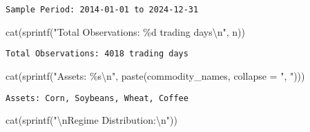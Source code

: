 \documentclass[
  10pt,
  a4paper,
]{article}
\newenvironment{Shaded}{\begin{snugshade}}{\end{snugshade}}
\newcommand{\AttributeTok}[1]{\textcolor[rgb]{0.40,0.45,0.13}{#1}}
\newcommand{\CommentTok}[1]{\textcolor[rgb]{0.37,0.37,0.37}{#1}}
\newcommand{\FunctionTok}[1]{\textcolor[rgb]{0.28,0.35,0.67}{#1}}
\newcommand{\NormalTok}[1]{\textcolor[rgb]{0.00,0.23,0.31}{#1}}
\newcommand{\OtherTok}[1]{\textcolor[rgb]{0.00,0.23,0.31}{#1}}
\newcommand{\SpecialCharTok}[1]{\textcolor[rgb]{0.37,0.37,0.37}{#1}}
\newcommand{\StringTok}[1]{\textcolor[rgb]{0.13,0.47,0.30}{#1}}
\begin{document}
\begin{Shaded}
\end{Shaded}

\begin{verbatim}
Sample Period: 2014-01-01 to 2024-12-31
\end{verbatim}

\begin{Shaded}
\begin{Highlighting}[]
\FunctionTok{cat}\NormalTok{(}\FunctionTok{sprintf}\NormalTok{(}\StringTok{"Total Observations: \%d trading days}\SpecialCharTok{\textbackslash{}n}\StringTok{"}\NormalTok{, n))}
\end{Highlighting}
\end{Shaded}

\begin{verbatim}
Total Observations: 4018 trading days
\end{verbatim}

\begin{Shaded}
\begin{Highlighting}[]
\FunctionTok{cat}\NormalTok{(}\FunctionTok{sprintf}\NormalTok{(}\StringTok{"Assets: \%s}\SpecialCharTok{\textbackslash{}n}\StringTok{"}\NormalTok{, }\FunctionTok{paste}\NormalTok{(commodity\_names, }\AttributeTok{collapse =} \StringTok{", "}\NormalTok{)))}
\end{Highlighting}
\end{Shaded}

\begin{verbatim}
Assets: Corn, Soybeans, Wheat, Coffee
\end{verbatim}

\begin{Shaded}
\begin{Highlighting}[]
\FunctionTok{cat}\NormalTok{(}\FunctionTok{sprintf}\NormalTok{(}\StringTok{"}\SpecialCharTok{\textbackslash{}n}\StringTok{Regime Distribution:}\SpecialCharTok{\textbackslash{}n}\StringTok{"}\NormalTok{))}
\end{Highlighting}
\end{Shaded}
\end{document}
